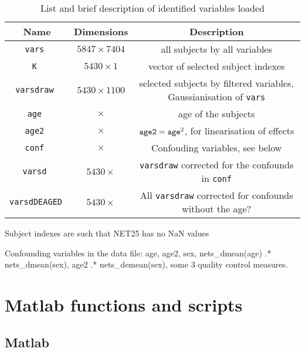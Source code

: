 \documentclass{article}
\begin{document}
\begin{table}
  \centering
  \caption{List and brief description of identified variables loaded}
  \begin{tabular}{ccc}
    \toprule
    \bf Name & \bf Dimensions & \bf Description \\
    \midrule
    \tt vars     &$5847 \times 7404$& all subjects by all variables\\
    \tt K        &$5430 \times 1   $& vector of selected subject indexes\\
    \tt varsdraw &$5430 \times 1100$& selected subjects by filtered variables, Gaussianisation of {\tt vars}\\
    \tt age      &$ \times $& age of the subjects\\
    \tt age2     &$ \times $& $\text{\tt age2} = \text{\tt age}^2$, for linearisation of effects\\
    \tt conf     &$ \times $& Confouding variables, see below \\
    \tt varsd    &$5430 \times $& {\tt varsdraw} corrected for the confounds in {\tt conf} \\
    \tt varsdDEAGED &$ 5430 \times $& All {\tt varsdraw} corrected for confounds without the age?\\
    \bottomrule
  \end{tabular}
  \label{tab:data-vars}
\end{table}


Subject indexes are such that NET25 has no NaN values

Confounding variables in the data file: age, age2, sex, nets\_dmean(age) .* nets\_dmean(sex), age2 .* nets\_demean(sex), some 3 quality control measures.

\section{Matlab functions and scripts\label{sec:matlab}}

\subsection{Matlab}
\end{document}
